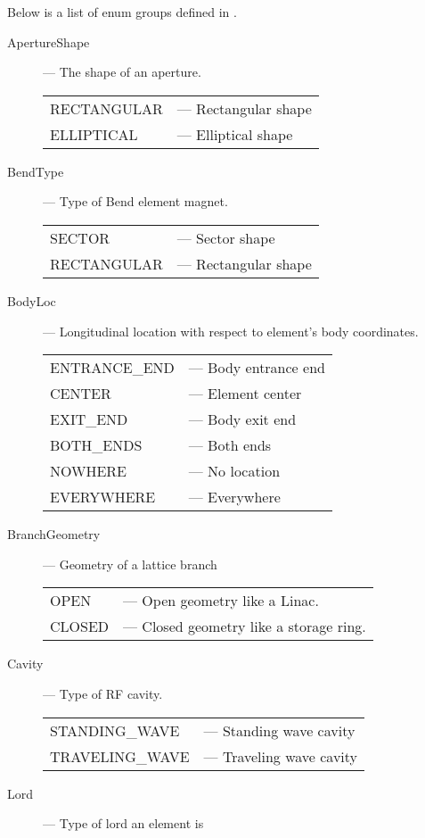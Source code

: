 Below is a list of enum groups defined in \accellat. 
\begin{description}
%
\item[ApertureShape] --- The shape of an aperture.\Newline 
\hspace*{-20pt}
\begin{tabular}{ll}
  RECTANGULAR & --- Rectangular shape \\
  ELLIPTICAL  & --- Elliptical shape \\
\end{tabular}
%
\item[BendType] --- Type of Bend element magnet.\Newline
\hspace*{-20pt}
\begin{tabular}{ll}
  SECTOR      & --- Sector shape\\
  RECTANGULAR & --- Rectangular shape \\
\end{tabular}
%
\item[BodyLoc] --- Longitudinal location with respect to element's body coordinates.\Newline
\hspace*{-20pt}
\begin{tabular}{ll}
  ENTRANCE_END & --- Body entrance end \\
  CENTER       & --- Element center \\
  EXIT_END     & --- Body exit end \\
  BOTH_ENDS    & --- Both ends \\
  NOWHERE      & --- No location \\
  EVERYWHERE   & --- Everywhere \\
\end{tabular}
%
\item[BranchGeometry] --- Geometry of a lattice branch\Newline
\hspace*{-20pt}
\begin{tabular}{ll}
  OPEN    & --- Open geometry like a Linac. \\
  CLOSED  & --- Closed geometry like a storage ring.
\end{tabular}
%
\item[Cavity] --- Type of RF cavity. \Newline
\hspace*{-20pt}
\begin{tabular}{ll}
  STANDING_WAVE   & --- Standing wave cavity \\
  TRAVELING_WAVE  & --- Traveling wave cavity \\
\end{tabular}
%
\item[Lord] --- Type of lord an element is \Newline

\end{description}
